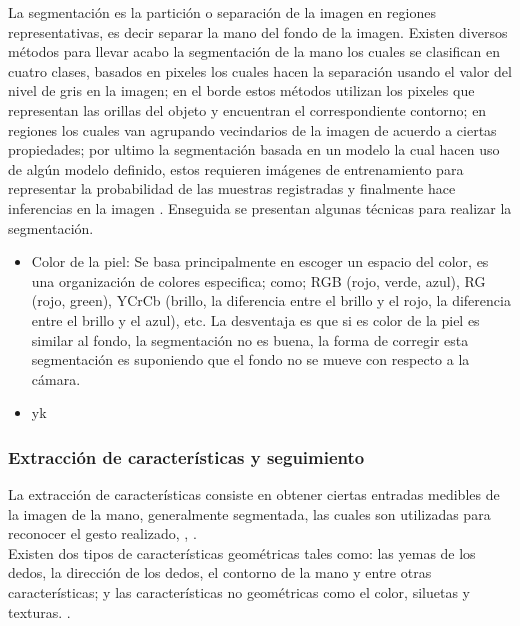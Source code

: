 La segmentación es la partición o separación de la imagen en regiones representativas, es decir separar la mano del fondo de la imagen. Existen diversos métodos para llevar acabo la segmentación de la mano los cuales se clasifican en cuatro clases, basados en pixeles los cuales hacen la separación usando el valor del nivel de gris en la imagen; en el borde estos métodos utilizan los pixeles que representan las orillas del objeto y encuentran el correspondiente contorno; en regiones los cuales van agrupando vecindarios de la imagen de acuerdo a ciertas propiedades; por ultimo la segmentación basada en un modelo la cual hacen uso de algún modelo definido, estos requieren imágenes de entrenamiento para representar la probabilidad de las muestras registradas y finalmente hace inferencias en la imagen \citep{Ibraheem2013}.
Enseguida se presentan algunas técnicas para realizar la segmentación.
\begin{itemize}
\item Color de la piel: Se basa principalmente en escoger un espacio del color, es una organización de colores especifica; como; RGB (rojo, verde, azul), RG (rojo, green), YCrCb (brillo, la diferencia entre el brillo y el rojo, la diferencia entre el brillo y el azul), etc. La desventaja es que si es color de la piel es similar al fondo, la segmentación no es buena, la forma de corregir esta segmentación es suponiendo que el fondo no se mueve con respecto a la cámara.
\item yk
\end{itemize}

\subsubsection{Extracción de características y seguimiento}\label{sssec:EtapaSeguimiento}  

La extracción de características consiste en obtener ciertas entradas medibles de la imagen de la mano, generalmente segmentada, las cuales son utilizadas para reconocer el gesto realizado, \citep{Premaratne2013}, \citep{Nayakwadi2014}.\\
Existen dos tipos de características geométricas tales como: las yemas de los dedos, la dirección de los dedos, el contorno de la mano y entre otras características; y las características no geométricas como el color, siluetas y texturas. \citep{Murthy2009}. 

